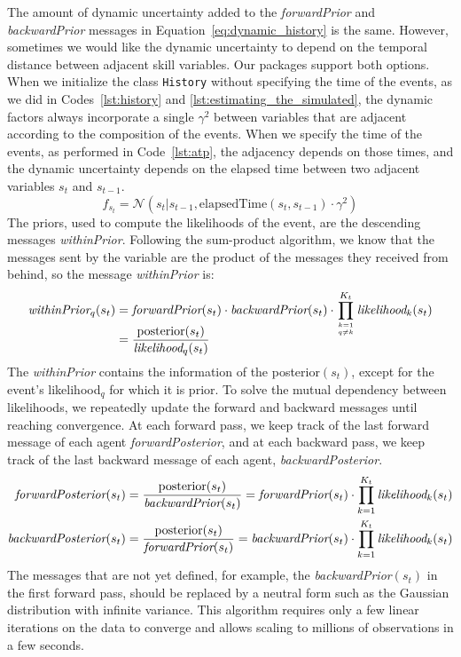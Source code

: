 \documentclass[article]{jss}
\newcommand{\N}{\mathcal{N}}
\newcommand\hfrac[2]{\genfrac{}{}{0pt}{}{#1}{#2}} %
\begin{document}
The amount of dynamic uncertainty added to the \emph{forwardPrior} and \emph{backwardPrior} messages in Equation~\ref{eq:dynamic_history} is the same. 
However, sometimes we would like the dynamic uncertainty to depend on the temporal distance between adjacent skill variables. 
Our packages support both options. 
When we initialize the class \texttt{History} without specifying the time of the events, as we did in Codes~\ref{lst:history} and \ref{lst:estimating_the_simulated}, the dynamic factors always incorporate a single $\gamma^2$ between variables that are adjacent according to the composition of the events. 
When we specify the time of the events, as performed in Code~\ref{lst:atp}, the adjacency depends on those times, and the dynamic uncertainty depends on the elapsed time between two adjacent variables $s_t$ and $s_{t-1}$. 
%
\begin{equation}
 f_{s_t} = \N(s_t | s_{t-1}, \text{elapsedTime}(s_t,s_{t-1})\cdot \gamma^2 )
\end{equation}
%
The priors, used to compute the likelihoods of the event, are the descending messages \emph{withinPrior}. 
Following the sum-product algorithm, we know that the messages sent by the variable are the product of the messages they received from behind, so the message \emph{withinPrior} is:
%
\begin{equation}
 \begin{split}
 \emph{withinPrior}_q(s_t) & = \emph{forwardPrior}(s_t) \cdot \emph{backwardPrior}(s_t) \cdot \prod_{\hfrac{k=1}{q\neq k}}^{K_t} \emph{likelihood}_k(s_t)  \\[-0.45cm]
 & = \frac{\text{posterior}(s_t) }{\emph{likelihood}_q(s_t)}
 \end{split}
 \end{equation}
%
The \emph{withinPrior} contains the information of the posterior$(s_t)$, except for the event's likelihood$_q$ for which it is prior. 
To solve the mutual dependency between likelihoods, we repeatedly update the forward and backward messages until reaching convergence. 
At each forward pass, we keep track of the last forward message of each agent \emph{forwardPosterior}, and at each backward pass, we keep track of the last backward message of each agent, \emph{backwardPosterior}. 
%
\begin{equation}
\begin{split}
  \emph{forwardPosterior}(s_t) & = \frac{\text{posterior}(s_t)}{\emph{backwardPrior}(s_t)} =  \emph{forwardPrior}(s_t) \cdot \prod_{k=1}^{K_t} \emph{likelihood}_k(s_t) \\  
  \emph{backwardPosterior}(s_t) & = \frac{\text{posterior}(s_t)}{\emph{forwardPrior}(s_t)} = \emph{backwardPrior}(s_t) \cdot \prod_{k=1}^{K_t} \emph{likelihood}_k(s_t)
\end{split}
\end{equation}
%
The messages that are not yet defined, for example, the \emph{backwardPrior}$(s_t)$ in the first forward pass, should be replaced by a neutral form such as the Gaussian distribution with infinite variance. 
This algorithm requires only a few linear iterations on the data to converge and allows scaling to millions of observations in a few seconds. 
\end{document}
